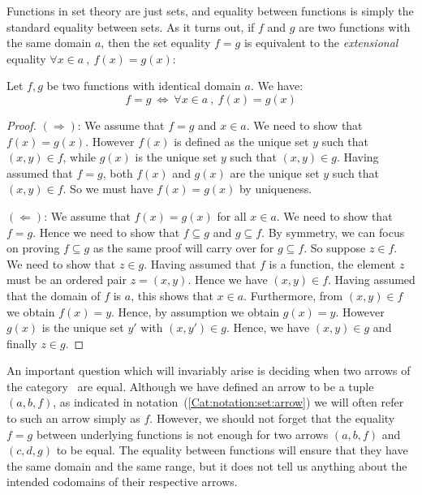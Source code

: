 Functions in set theory are just sets, and equality between functions is 
simply the standard equality between sets. As it turns out, if $f$ and $g$
are two functions with the same domain $a$, then the set equality $f = g$
is equivalent to the {\em extensional} equality $\forall x\in a\ ,\ f(x)=g(x)$:

\begin{prop}\label{Cat:prop:functions:extensionality}
    Let $f,g$ be two functions with identical domain $a$. We have:
        \[
        f = g\ \Leftrightarrow\ \forall x\in a\ ,\ f(x)=g(x)
        \]
\end{prop}
\begin{proof}
    $(\Rightarrow)$: We assume that $f=g$ and $x\in a$. We need to show that 
    $f(x)=g(x)$. However $f(x)$ is defined as the unique set $y$ such that
    $(x,y)\in f$, while $g(x)$ is the unique set $y$ such that $(x,y)\in g$.
    Having assumed that $f=g$, both $f(x)$ and $g(x)$ are the unique set $y$
    such that $(x,y)\in f$. So we must have $f(x)=g(x)$ by uniqueness.

    \noindent
    $(\Leftarrow)$: We assume that $f(x)=g(x)$ for all $x\in a$. We need to show
    that $f=g$. Hence we need to show that $f\subseteq g$ and $g\subseteq f$.
    By symmetry, we can focus on proving $f\subseteq g$ as the same proof will
    carry over for $g\subseteq f$. So suppose $z\in f$. We need to show that 
    $z\in g$. Having assumed that $f$ is a function, the element $z$ must be
    an ordered pair $z=(x,y)$. Hence we have $(x,y)\in f$. Having assumed
    that the domain of $f$ is $a$, this shows that $x\in a$. Furthermore,
    from $(x,y)\in f$ we obtain $f(x)=y$. Hence, by assumption we obtain
    $g(x)=y$. However $g(x)$ is the unique set $y'$ with $(x,y')\in g$.
    Hence, we have $(x,y)\in g$ and finally $z\in g$.
\end{proof}

An important question which will invariably arise is deciding when two
arrows of the category \Set\ are equal. Although we have defined an
arrow to be a tuple $(a,b,f)$, as indicated in 
notation~(\ref{Cat:notation:set:arrow}) we will often refer to such an
arrow simply as $f$. However, we should not forget that the equality
$f=g$ between underlying functions is not enough for two arrows
$(a,b,f)$ and $(c,d,g)$ to be equal. The equality between functions
will ensure that they have the same domain and the same
range, but it does not tell us anything
about the intended codomains of their respective arrows.

